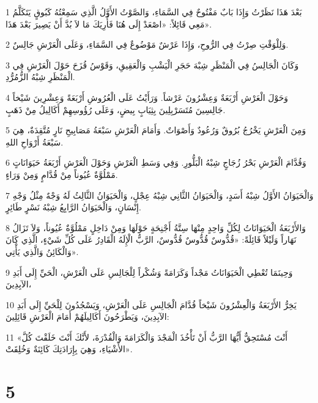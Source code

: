 \par 1 بَعْدَ هَذَا نَظَرْتُ وَإِذَا بَابٌ مَفْتُوحٌ فِي السَّمَاءِ، وَالصَّوْتُ الأَوَّلُ الَّذِي سَمِعْتُهُ كَبُوقٍ يَتَكَلَّمُ مَعِي قَائِلاً: «اصْعَدْ إِلَى هُنَا فَأُرِيَكَ مَا لاَ بُدَّ أَنْ يَصِيرَ بَعْدَ هَذَا».
\par 2 وَلِلْوَقْتِ صِرْتُ فِي الرُّوحِ، وَإِذَا عَرْشٌ مَوْضُوعٌ فِي السَّمَاءِ، وَعَلَى الْعَرْشِ جَالِسٌ.
\par 3 وَكَانَ الْجَالِسُ فِي الْمَنْظَرِ شِبْهَ حَجَرِ الْيَشْبِ وَالْعَقِيقِ، وَقَوْسُ قُزَحَ حَوْلَ الْعَرْشِ فِي الْمَنْظَرِ شِبْهُ الزُّمُرُّدِ.
\par 4 وَحَوْلَ الْعَرْشِ أَرْبَعَةٌ وَعِشْرُونَ عَرْشاً. وَرَأَيْتُ عَلَى الْعُرُوشِ أَرْبَعَةً وَعِشْرِينَ شَيْخاً جَالِسِينَ مُتَسَرْبِلِينَ بِثِيَابٍ بِيضٍ، وَعَلَى رُؤُوسِهِمْ أَكَالِيلُ مِنْ ذَهَبٍ.
\par 5 وَمِنَ الْعَرْشِ يَخْرُجُ بُرُوقٌ وَرُعُودٌ وَأَصْوَاتٌ. وَأَمَامَ الْعَرْشِ سَبْعَةُ مَصَابِيحِ نَارٍ مُتَّقِدَةٌ، هِيَ سَبْعَةُ أَرْوَاحِ اللهِ.
\par 6 وَقُدَّامَ الْعَرْشِ بَحْرُ زُجَاجٍ شِبْهُ الْبَلُّورِ. وَفِي وَسَطِ الْعَرْشِ وَحَوْلَ الْعَرْشِ أَرْبَعَةُ حَيَوَانَاتٍ مَمْلُوَّةٌ عُيُوناً مِنْ قُدَّامٍ وَمِنْ وَرَاءٍ.
\par 7 وَالْحَيَوَانُ الأَوَّلُ شِبْهُ أَسَدٍ، وَالْحَيَوَانُ الثَّانِي شِبْهُ عِجْلٍ، وَالْحَيَوَانُ الثَّالِثُ لَهُ وَجْهٌ مِثْلُ وَجْهِ إِنْسَانٍ، وَالْحَيَوَانُ الرَّابِعُ شِبْهُ نَسْرٍ طَائِرٍ.
\par 8 وَالأَرْبَعَةُ الْحَيَوَانَاتُ لِكُلِّ وَاحِدٍ مِنْهَا سِتَّةُ أَجْنِحَةٍ حَوْلَهَا وَمِنْ دَاخِلٍ مَمْلُوَّةٌ عُيُوناً، وَلاَ تَزَالُ نَهَاراً وَلَيْلاً قَائِلَةً: «قُدُّوسٌ قُدُّوسٌ قُدُّوسٌ، الرَّبُّ الْإِلَهُ الْقَادِرُ عَلَى كُلِّ شَيْءٍ، الَّذِي كَانَ وَالْكَائِنُ وَالَّذِي يَأْتِي».
\par 9 وَحِينَمَا تُعْطِي الْحَيَوَانَاتُ مَجْداً وَكَرَامَةً وَشُكْراً لِلْجَالِسِ عَلَى الْعَرْشِ، الْحَيِّ إِلَى أَبَدِ الآبِدِينَ،
\par 10 يَخِرُّ الأَرْبَعَةُ وَالْعِشْرُونَ شَيْخاً قُدَّامَ الْجَالِسِ عَلَى الْعَرْشِ، وَيَسْجُدُونَ لِلْحَيِّ إِلَى أَبَدِ الآبِدِينَ، وَيَطْرَحُونَ أَكَالِيلَهُمْ أَمَامَ الْعَرْشِ قَائِلِينَ:
\par 11 «أَنْتَ مُسْتَحِقٌّ أَيُّهَا الرَّبُّ أَنْ تَأْخُذَ الْمَجْدَ وَالْكَرَامَةَ وَالْقُدْرَةَ، لأَنَّكَ أَنْتَ خَلَقْتَ كُلَّ الأَشْيَاءِ، وَهِيَ بِإِرَادَتِكَ كَائِنَةٌ وَخُلِقَتْ».

\chapter{5}

